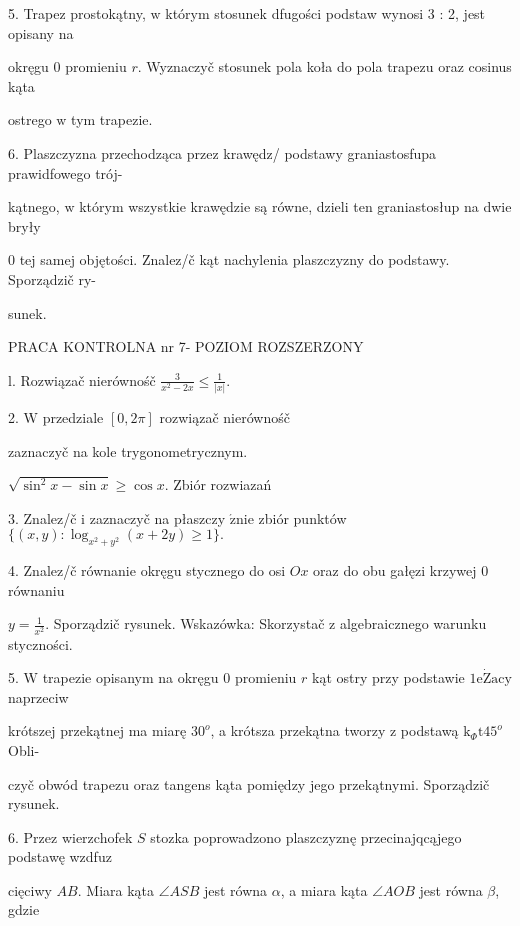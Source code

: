\documentclass[a4paper,12pt]{article}
\begin{document}
5. Trapez prostokątny, $\mathrm{w}$ którym stosunek dfugości podstaw wynosi 3 : 2, jest opisany na

okręgu $0$ promieniu $r$. Wyznaczyč stosunek pola koła do pola trapezu oraz cosinus kąta

ostrego $\mathrm{w}$ tym trapezie.

6. Plaszczyzna przechodząca przez krawędz/ podstawy graniastosfupa prawidfowego trój-

kątnego, $\mathrm{w}$ którym wszystkie krawędzie są równe, dzieli ten graniastosłup na dwie bryły

$0$ tej samej objętości. Znalez/č kąt nachylenia plaszczyzny do podstawy. Sporządzič ry-

sunek.





PRACA KONTROLNA nr 7- POZIOM ROZSZERZONY

l. Rozwiązač nierównośč $\displaystyle \frac{3}{x^{2}-2x}\leq\frac{1}{|x|}.$

2. $\mathrm{W}$ przedziale $[0,2\pi]$ rozwiązač nierównośč

zaznaczyč na kole trygonometrycznym.

$\sqrt{\sin^{2}x-\sin x} \geq \cos x$. Zbiór rozwiazań

3. Znalez/č $\mathrm{i}$ zaznaczyč na płaszczy $\acute{\mathrm{z}}\mathrm{n}\mathrm{i}\mathrm{e}$ zbiór punktów $\{(x,y):\log_{x^{2}+y^{2}}(x+2y)\geq 1\}.$

4. Znalez/č równanie okręgu stycznego do osi $Ox$ oraz do obu gałęzi krzywej $0$ równaniu

$y=\displaystyle \frac{1}{x^{2}}$. Sporządzič rysunek. Wskazówka: Skorzystač $\mathrm{z}$ algebraicznego warunku styczności.

5. $\mathrm{W}$ trapezie opisanym na okręgu $0$ promieniu $r$ kąt ostry przy podstawie $1\mathrm{e}\dot{\mathrm{Z}}\mathrm{a}\mathrm{c}\mathrm{y}$ naprzeciw

krótszej przekątnej ma miarę $30^{o}$, a krótsza przekątna tworzy $\mathrm{z}$ podstawą $\mathrm{k}_{\Phi}\mathrm{t}45^{o}$ Obli-

czyč obwód trapezu oraz tangens kąta pomiędzy jego przekątnymi. Sporządzič rysunek.

6. Przez wierzchofek $S$ stozka poprowadzono plaszczyznę przecinajqcąjego podstawę wzdfuz

cięciwy $AB$. Miara kąta $\angle ASB$ jest równa $\alpha$, a miara kąta $\angle AOB$ jest równa $\beta$, gdzie
\end{document}
